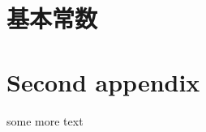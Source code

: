 %
\appendix
\appendixpage


    \begin{appendices}
    \renewcommand{\thesection}{\Alph{section}}

      \section{基本常数}



      \section{Second appendix}

    some more text

    \end{appendices}
